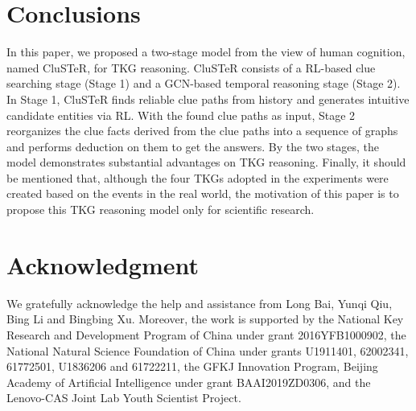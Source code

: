 \documentclass[11pt,a4paper]{article}
\begin{document}
\section{Conclusions}
In this paper, we proposed a two-stage model from the view of human cognition,
named CluSTeR, for TKG reasoning. CluSTeR consists of a RL-based clue searching
stage (Stage 1) and a GCN-based temporal reasoning stage (Stage 2). In Stage 1,
CluSTeR finds reliable clue paths from history and generates intuitive candidate
entities via RL.  With the found clue paths as input, Stage 2 reorganizes the
clue facts derived from the clue paths into a sequence of graphs and performs
deduction on them to get the answers. By the two stages, the model demonstrates
substantial advantages on TKG reasoning. Finally, it should be mentioned that, although the four TKGs adopted in the experiments were created based on the events in the real world, the motivation of this paper is to propose this TKG reasoning model only for scientific research.

\section*{Acknowledgment}
We gratefully acknowledge the help and assistance from Long Bai, Yunqi Qiu, Bing
Li and Bingbing Xu. Moreover, the work is supported by the National Key Research and
Development Program of China under grant 2016YFB1000902, the National Natural
Science Foundation of China under grants U1911401, 62002341, 61772501, U1836206 and 61722211, the GFKJ Innovation Program, Beijing Academy of
Artificial Intelligence under grant BAAI2019ZD0306, and the Lenovo-CAS Joint Lab
Youth Scientist Project. 
\end{document}
